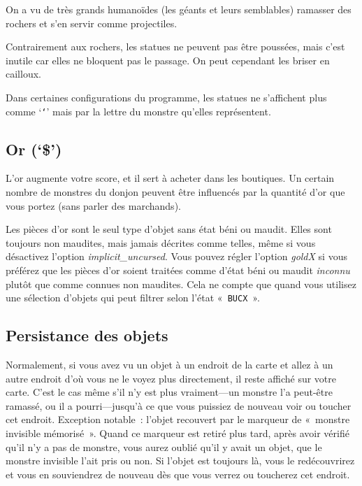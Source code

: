 \documentclass[titlepage]{article}
\begin{document}
On a vu de très grands humanoïdes (les géants et leurs semblables)
ramasser des rochers et s'en servir comme projectiles.


Contrairement aux rochers, les statues ne peuvent pas être poussées, mais
c'est inutile car elles ne bloquent pas le passage.
On peut cependant les briser en cailloux.


Dans certaines configurations du programme, les statues ne s'affichent
plus comme `\texttt{`}' mais par la lettre du monstre qu'elles
représentent.

\subsection{Or (`\$')}



L'or augmente votre score, et il sert à acheter dans les boutiques.
Un certain nombre de monstres du donjon peuvent être influencés par la
quantité d'or que vous portez (sans parler des marchands).


Les pièces d'or sont le seul type d'objet sans état béni ou maudit.
Elles sont toujours non maudites, mais jamais décrites comme telles, même
si vous désactivez l'option
\textit{implicit\_uncursed}.
Vous pouvez régler l'option
\textit{goldX}
si vous préférez que les pièces d'or soient traitées comme d'état béni ou
maudit \textit{inconnu} plutôt que comme connues non maudites.
Cela ne compte que quand vous utilisez une sélection d'objets qui peut
filtrer selon l'état «~\texttt{BUCX}~».

\subsection{Persistance des objets}



Normalement, si vous avez vu un objet à un endroit de la carte et allez à
un autre endroit d'où vous ne le voyez plus directement, il reste affiché
sur votre carte.
C'est le cas même s'il n'y est plus vraiment---un monstre l'a peut-être
ramassé, ou il a pourri---jusqu'à ce que vous puissiez de nouveau voir ou
toucher cet endroit.
Exception notable~: l'objet recouvert par le marqueur de «~monstre
invisible mémorisé~».
Quand ce marqueur est retiré plus tard, après avoir vérifié qu'il n'y a
pas de monstre, vous aurez oublié qu'il y avait un objet, que le monstre
invisible l'ait pris ou non.
Si l'objet est toujours là, vous le redécouvrirez et vous en souviendrez de
nouveau dès que vous verrez ou toucherez cet endroit.
\end{document}
